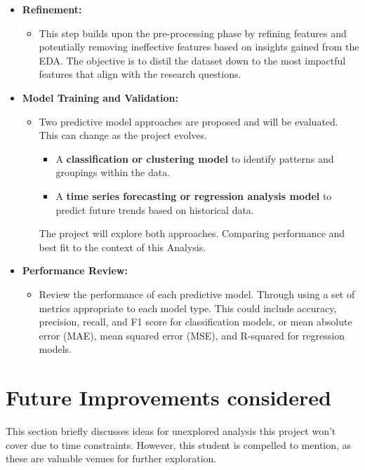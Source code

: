 \documentclass[12pt, a4paper]{article}
\begin{document}
\begin{itemize}
            \item \textbf{Refinement:}
                \begin{itemize}
                        \item This step builds upon the pre-processing phase by refining features and potentially removing ineffective features based on insights gained from the EDA.
                        \newline The objective is to distil the dataset down to the most impactful features that align with the research questions.
                \end{itemize}
            \item \textbf{Model Training and Validation:}
                \begin{itemize}
                    \item Two predictive model approaches are proposed and will be evaluated. This can change as the project evolves.
                    \begin{itemize}
                        \item  A \textbf{classification or clustering model} to identify patterns and groupings within the data.
                        \item A \textbf{time series forecasting or regression analysis model} to predict future trends based on historical data.
                    \end{itemize}
                    The project will explore both approaches. Comparing performance and best fit to the context of this Analysis.

                \end{itemize}
            \item \textbf{Performance Review:}
                \begin{itemize}
                    \item Review the performance of each predictive model.
                    Through using a set of metrics appropriate to each model type.
                    \newline This could include accuracy, precision, recall, and F1 score for classification models, or mean absolute error (MAE), mean squared error (MSE), and R-squared for regression models.
                \end{itemize}
        \end{itemize}

        \section*{Future Improvements considered}
    \label{sec:future}
        This section briefly discusses ideas for unexplored analysis this project won't cover due to time constraints.
        However, this student is compelled to mention, as these are valuable venues for further exploration.
\end{document}
